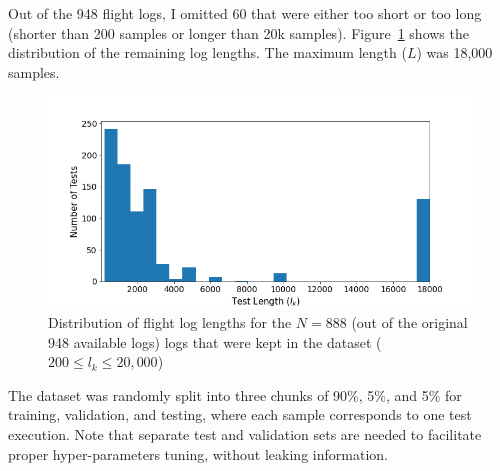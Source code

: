 Out of the 948 flight logs, I omitted 60 that were either too short or too long (shorter than 200 samples or longer than 20k samples). Figure~\ref{fig:test_lengths} shows the distribution of the remaining log lengths. The maximum length ($L$) was 18,000 samples.

\begin{figure}
    \centering
    \includegraphics[width=\columnwidth]{ASE_files/test_lengths.png}
    \caption{Distribution of flight log lengths for the $N=888$ (out of the original 948 available logs) logs that were kept in the dataset ($200 \leq l_k \leq 20,000$)}
    \label{fig:test_lengths}
\end{figure}

The dataset was randomly split into three chunks of 90\%, 5\%, and 5\% for training, validation, and testing, where each sample corresponds to one test execution. Note that separate test and validation sets are needed to facilitate proper hyper-parameters tuning, without leaking information. 

